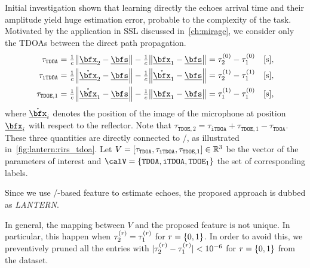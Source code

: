 \newcommand{\setTDOA}{\ensuremath{\set{\mathtt{TDOA}, \mathtt{iTDOA}, {\mathtt{TDOE}_1}}}}
\mynewline
Initial investigation shown that learning directly the echoes arrival time and their amplitude yield huge estimation error, probable to the complexity of the task.
Motivated by the application in \ac{SSL} discussed in~\cref{ch:mirage}, we consider only the \acfp{TDOA} between the direct path propagation.
\begin{align}
    \tau_\mathtt{TDOA}  &= \tfrac{1}{c} \norm{\positionMicrophone_2 - \positionSource} - \tfrac{1}{c} \norm{\positionMicrophone_1 - \positionSource} = \tau_2^{(0)} - \tau_1^{(0)} \quad[\text{s}],\\
    \tau_\mathtt{iTDOA} &= \tfrac{1}{c} \norm{\mathring{\positionMicrophone}_2 - \positionSource} - \tfrac{1}{c} \norm{\mathring{\positionMicrophone}_1 - \positionSource} = \tau_2^{(1)} - \tau_1^{(1)} \quad[\text{s}],\\
    \tau_{\mathtt{TDOE},1}  &= \tfrac{1}{c} \norm{\mathring{\positionMicrophone}_1 - \positionSource} - \tfrac{1}{c} \norm{\positionMicrophone_1 - \positionSource} = \tau_1^{(1)} - \tau_1^{(0)} \quad[\text{s}],
\end{align}
where $\mathring{\positionMicrophone}_i$ denotes the position of the image of the microphone at position $\positionMicrophone_i$ with respect to the reflector.
Note that $\tau_{\mathtt{TDOE},2} = \tau_\mathtt{iTDOA} + \tau_{\mathtt{TDOE}, 1} - \tau_\mathtt{TDOA}$.
These three quantities are directly connected to \RIRs/, as illustrated in~\cref{fig:lantern:rirs_tdoa}. Let $V = \klist{\tau_{\mathtt{TDOA}}, \tau_{\mathtt{iTDOA}}, \tau_{\mathtt{TDOE},1}}\in\mathbb{R}^3$ be the vector of the parameters of interest
and $\calV = \setTDOA$ the set of corresponding labels.

\mynewline
Since we use \ReTF/-based feature to estimate echoes, the proposed approach is dubbed as \textit{\acf{LANTERN}}.

\mynewline
In general, the mapping between $V$ and the proposed feature is not unique.
In particular, this happen when $\tau_2^{(r)} = \tau_1^{(r)}$ for $\idxEch=\set{0,1}$.
In order to avoid this, we preventively pruned all the entries with $| \tau_2^{(r)} - \tau_1^{(r)} | < 10^{-6}$ for $\idxEch=\set{0,1}$ from the dataset.

